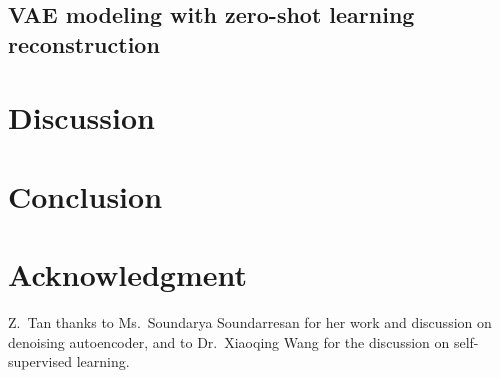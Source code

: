 \documentclass[journal,twoside,web]{ieeecolor}
\begin{document}
	\subsection{VAE modeling with zero-shot learning reconstruction}


	\section{Discussion}


	\section{Conclusion}


	\section*{Acknowledgment}

	Z.~Tan thanks to Ms.~Soundarya Soundarresan for
	her work and discussion on denoising autoencoder,
	and to Dr.~Xiaoqing Wang for
	the discussion on self-supervised learning.

	
	
\end{document}
